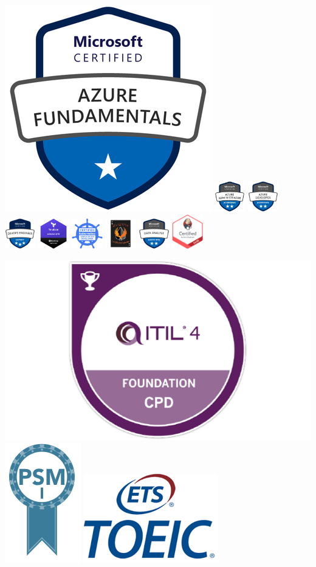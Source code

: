 \documentclass[10pt,a4paper,ragged2e]{altacv}
\begin{document}
\begin{paracol}{2}
\includegraphics[width=0.1 \textwidth]{azure-900.png}
\includegraphics[width=0.1\textwidth]{azure-administrator-associate.png}
\includegraphics[width=0.1\textwidth]{azure-developer-associate-600x600.png}
\includegraphics[width=0.1\textwidth]{CERT-Expert-DevOps-Engineer-600x600.png}
\includegraphics[width=0.1\textwidth]{Terraform-Associate-Badge.png}
\includegraphics[width=0.1\textwidth]{ckad_from_cncfsite.png}
\includegraphics[width=0.1\textwidth]{aceAssociatetBadgeArtboard_1.png}
\includegraphics[width=0.1\textwidth]{CERT-Associate-Data-Analyst-600x600.png}
\includegraphics[width=0.1\textwidth]{jenkins}

\divider


\includegraphics[width=0.16 \textwidth]{itil} \includegraphics[width=0.06 \textwidth]{psm}
\hspace{5mm}\includegraphics[width=0.12 \textwidth]{toeic}


\end{paracol}
\end{document}
